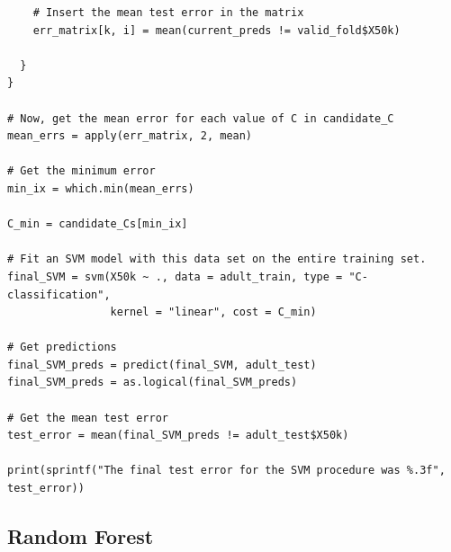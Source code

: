 \documentclass{article}
\begin{document}
\begin{verbatim}
    # Insert the mean test error in the matrix 
    err_matrix[k, i] = mean(current_preds != valid_fold$X50k)
    
  }
}

# Now, get the mean error for each value of C in candidate_C
mean_errs = apply(err_matrix, 2, mean)

# Get the minimum error
min_ix = which.min(mean_errs)

C_min = candidate_Cs[min_ix]

# Fit an SVM model with this data set on the entire training set. 
final_SVM = svm(X50k ~ ., data = adult_train, type = "C-classification",
                kernel = "linear", cost = C_min)

# Get predictions 
final_SVM_preds = predict(final_SVM, adult_test)
final_SVM_preds = as.logical(final_SVM_preds)

# Get the mean test error 
test_error = mean(final_SVM_preds != adult_test$X50k)

print(sprintf("The final test error for the SVM procedure was %.3f", test_error))

\end{verbatim}

\subsection{Random Forest}

    
\end{document}
